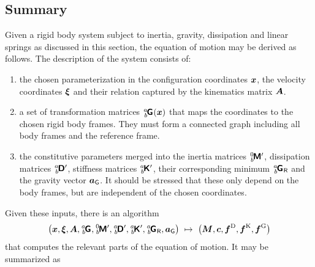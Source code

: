 \subsection{Summary}\label{sec:MechRBSSummary}
Given a rigid body system subject to inertia, gravity, dissipation and linear springs as discussed in this section, the equation of motion may be derived as follows.
The description of the system consists of:
\begin{enumerate}
 \item the chosen parameterization in the configuration coordinates $\boldsymbol{x}$, the velocity coordinates $\boldsymbol{\xi}$ and their relation captured by the kinematics matrix $\boldsymbol{A}$.
 \item a set of transformation matrices $\bodyHomoCoord{\BidxI}{\BidxII}(\sysCoord)$ that maps the coordinates to the chosen rigid body frames. 
 They must form a connected graph including all body frames and the reference frame.
 \item the constitutive parameters merged into the inertia matrices $\bodyInertiaMatp{0}{\BidxII}$, dissipation matrices $\bodyDissMatp{\BidxI}{\BidxII}$, stiffness matrices $\bodyStiffMatp{\BidxI}{\BidxII}$, their corresponding minimum $\bodyHomoCoordR{\BidxI}{\BidxII}$ and the gravity vector $\boldsymbol{a}_{\mathsf{G}}$.
 It should be stressed that these only depend on the body frames, but are independent of the chosen coordinates.
\end{enumerate}
Given these inputs, there is an algorithm 
\begin{align}
 \big( \sysCoord, \sysVel, \kinMat, \bodyHomoCoord{\BidxI}{\BidxII}, \bodyInertiaMatp{0}{\BidxII}, \bodyDissMatp{\BidxI}{\BidxII}, \bodyStiffMatp{\BidxI}{\BidxII}, \bodyHomoCoordR{\BidxI}{\BidxII}, \gravityAcc \big) \ \mapsto \ \big( \sysInertiaMat, \gyroForce, \genForceDiss, \genForceStiff, \genForceGravity \big)
\end{align}
that computes the relevant parts of the equation of motion.
It may be summarized as

